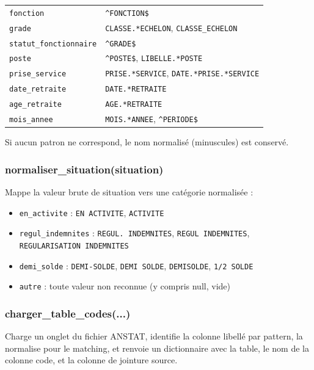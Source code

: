 \documentclass[12pt,a4paper,french]{report}
\begin{document}
\begin{longtable}{lp{7.5cm}}
  \texttt{fonction} & \texttt{\^{}FONCTION\$} \\
  \texttt{grade} & \texttt{CLASSE.*ECHELON}, \texttt{CLASSE\_ECHELON} \\
  \texttt{statut\_fonctionnaire} & \texttt{\^{}GRADE\$} \\
  \texttt{poste} & \texttt{\^{}POSTE\$}, \texttt{LIBELLE.*POSTE} \\
  \texttt{prise\_service} & \texttt{PRISE.*SERVICE},
    \texttt{DATE.*PRISE.*SERVICE} \\
  \texttt{date\_retraite} & \texttt{DATE.*RETRAITE} \\
  \texttt{age\_retraite} & \texttt{AGE.*RETRAITE} \\
  \texttt{mois\_annee} & \texttt{MOIS.*ANNEE}, \texttt{\^{}PERIODE\$} \\
  \bottomrule
\end{longtable}

Si aucun patron ne correspond, le nom normalisé (minuscules) est conservé.

\subsubsection{normaliser\_situation(situation)}

Mappe la valeur brute de situation vers une catégorie normalisée :
\begin{itemize}[nosep]
  \item \texttt{en\_activite} : \texttt{EN ACTIVITE}, \texttt{ACTIVITE}
  \item \texttt{regul\_indemnites} : \texttt{REGUL. INDEMNITES},
        \texttt{REGUL INDEMNITES}, \texttt{REGULARISATION INDEMNITES}
  \item \texttt{demi\_solde} : \texttt{DEMI-SOLDE}, \texttt{DEMI SOLDE},
        \texttt{DEMISOLDE}, \texttt{1/2 SOLDE}
  \item \texttt{autre} : toute valeur non reconnue (y compris null, vide)
\end{itemize}

\subsubsection{charger\_table\_codes(...)}

Charge un onglet du fichier ANSTAT, identifie la colonne libellé par pattern,
la normalise pour le matching, et renvoie un dictionnaire avec la table,
le nom de la colonne code, et la colonne de jointure source.
\end{document}
